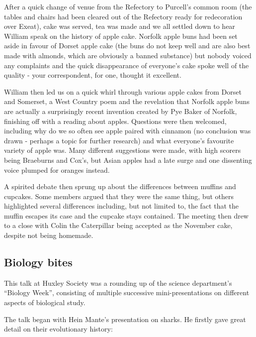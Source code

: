 After a quick change of venue from the Refectory to Purcell's common
room (the tables and chairs had been cleared out of the Refectory ready
for redecoration over Exeat), cake was served, tea was made and we all
settled down to hear William speak on the history of apple cake. Norfolk
apple buns had been set aside in favour of Dorset apple cake (the buns
do not keep well and are also best made with almonds, which are
obviously a banned substance) but nobody voiced any complaints and the
quick disappearance of everyone's cake spoke well of the quality - your
correspondent, for one, thought it excellent.

William then led us on a quick whirl through various apple cakes from
Dorset and Somerset, a West Country poem and the revelation that Norfolk
apple buns are actually a surprisingly recent invention created by Pye
Baker of Norfolk, finishing off with a reading about apples. Questions
were then welcomed, including why do we so often see apple paired with
cinnamon (no conclusion was drawn - perhaps a topic for further
research) and what everyone's favourite variety of apple was. Many
different suggestions were made, with high scorers being Braeburns and
Cox's, but Asian apples had a late surge and one dissenting voice
plumped for oranges instead.

A spirited debate then sprung up about the differences between muffins
and cupcakes. Some members argued that they were the same thing, but
others highlighted several differences including, but not limited to,
the fact that the muffin escapes its case and the cupcake stays
contained. The meeting then drew to a close with Colin the Caterpillar
being accepted as the November cake, despite not being homemade.

\subsection{Biology bites}\label{biology-bites}

This talk at Huxley Society was a rounding up of the science
department's ``Biology Week'', consisting of multiple successive
mini-presentations on different aspects of biological study.

The talk began with Hein Mante's presentation on sharks. He firstly gave
great detail on their evolutionary history:

